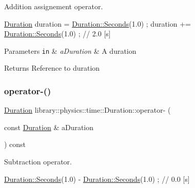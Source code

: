 Addition assignement operator. 


\begin{DoxyCode}
\hyperlink{classlibrary_1_1physics_1_1time_1_1_duration_a0a70efcf487a841da572afcf00001f64}{Duration} duration = \hyperlink{classlibrary_1_1physics_1_1time_1_1_duration_ae10891c94a1b2278c444cb44b37132f1}{Duration::Seconds}(1.0) ;
duration += \hyperlink{classlibrary_1_1physics_1_1time_1_1_duration_ae10891c94a1b2278c444cb44b37132f1}{Duration::Seconds}(1.0) ; \textcolor{comment}{// 2.0 [s]}
\end{DoxyCode}



\begin{DoxyParams}[1]{Parameters}
\mbox{\tt in}  & {\em a\+Duration} & A duration \\
\hline
\end{DoxyParams}
\begin{DoxyReturn}{Returns}
Reference to duration 
\end{DoxyReturn}
\mbox{\label{classlibrary_1_1physics_1_1time_1_1_duration_a9d45bbc3db56c0163bb5d33c41888879}} 
\subsubsection{\texorpdfstring{operator-\/()}{operator-()}\hspace{0.1cm}{\footnotesize\ttfamily [1/2]}}
{\footnotesize\ttfamily \hyperlink{classlibrary_1_1physics_1_1time_1_1_duration}{Duration} library\+::physics\+::time\+::\+Duration\+::operator-\/ (\begin{DoxyParamCaption}\item[{const \hyperlink{classlibrary_1_1physics_1_1time_1_1_duration}{Duration} \&}]{a\+Duration }\end{DoxyParamCaption}) const}



Subtraction operator. 


\begin{DoxyCode}
\hyperlink{classlibrary_1_1physics_1_1time_1_1_duration_ae10891c94a1b2278c444cb44b37132f1}{Duration::Seconds}(1.0) - \hyperlink{classlibrary_1_1physics_1_1time_1_1_duration_ae10891c94a1b2278c444cb44b37132f1}{Duration::Seconds}(1.0) ; \textcolor{comment}{// 0.0 [s]}
\end{DoxyCode}



